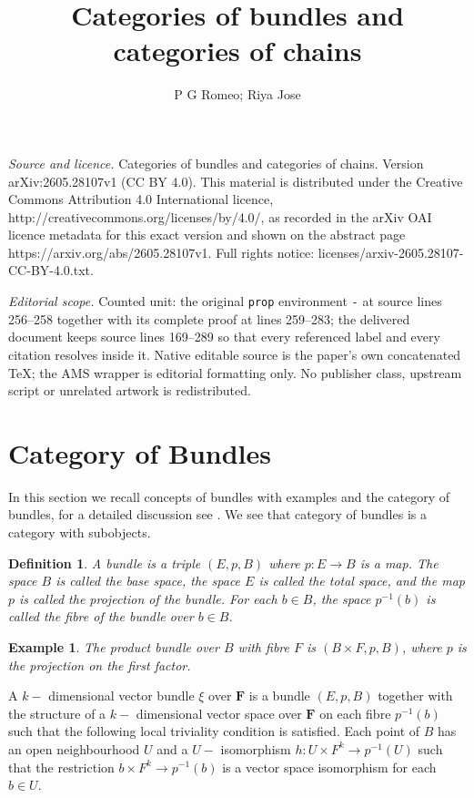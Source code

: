 \documentclass[10pt,a4paper]{amsart}
\newtheorem{exam}{Example}
\newtheorem{defn}{Definition}
\begin{document}
\title[Categories of bundles and categories of chains]{Categories of bundles and categories of chains}
\author{P G Romeo; Riya Jose}
\date{}
\maketitle
\noindent\emph{Source and licence.} Categories of bundles and categories of chains. Version arXiv:2605.28107v1 (CC BY 4.0). This material is distributed under the Creative Commons Attribution 4.0 International licence, http://creativecommons.org/licenses/by/4.0/, as recorded in the arXiv OAI licence metadata for this exact version and shown on the abstract page https://arxiv.org/abs/2605.28107v1. Full rights notice: licenses/arxiv-2605.28107-CC-BY-4.0.txt.\par\smallskip
\noindent\textit{Editorial scope.} Counted unit: the original \texttt{prop} environment \texttt{-} at source lines 256--258 together with its complete proof at lines 259--283; the delivered document keeps source lines 169--289 so that every referenced label and every citation resolves inside it. Native editable source is the paper's own concatenated TeX; the AMS wrapper is editorial formatting only. No publisher class, upstream script or unrelated artwork is redistributed.
	\section{Category of Bundles}
	In this section we recall concepts of bundles with examples and the category of bundles, for a detailed discussion see \cite{Dale}. We see that category of bundles is a category with subobjects.
	
	\begin{defn}
		A bundle is a triple $(E,p,B)$ where $p: E \rightarrow B$ is a map. The space $B$ is called the base space, the space $E$ is called the total space, and the map $p$ is called the projection of the bundle. For each $b \in B$, the space $p^{-1} (b) $ is called the fibre of the bundle over $b \in B$. 
		\end{defn}
	
	
	\begin{exam}
		The product bundle over $B$ with fibre $F$ is $(B \times F, p,B)$, where $p$ is the projection on the first factor.
	\end{exam}

		A $k-$ dimensional vector bundle $\xi$ over $\textbf{F}$ is a bundle $(E,p,B)$ together with the structure of a $k-$ dimensional vector space over $\textbf{F}$ on each fibre $p^{-1} (b) $ such that the following local triviality condition is satisfied. Each point of $B$ has an open neighbourhood $U$ and a  $U-$ isomorphism $h: U \times F^k \rightarrow p^{-1}(U)$ such that the restriction $ b \times F^k \rightarrow p^{-1} (b)$ is a vector space isomorphism for each $b \in U$.
		
\end{document}
